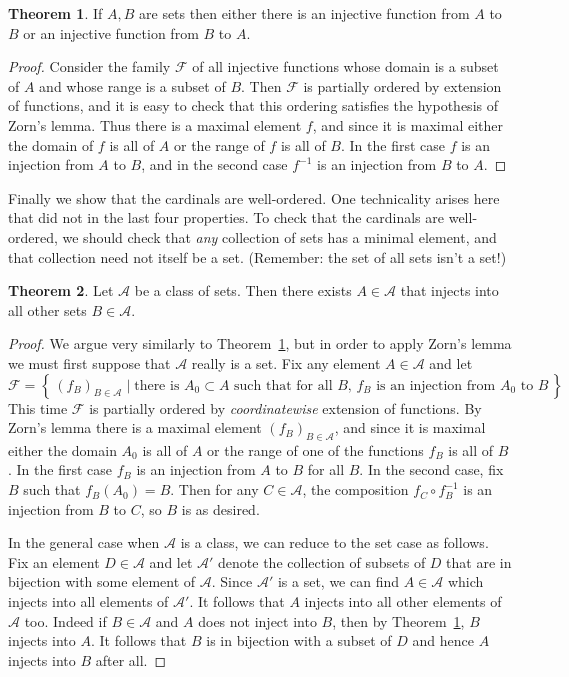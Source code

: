 \documentclass[11pt,oneside]{amsart}
\newcommand{\set}[1]{\left\{\,#1\,\right\}}
\theoremstyle{definition}
\newtheorem{thm}{Theorem}[section]
\theoremstyle{definition}
\theoremstyle{remark}
\begin{document}
\begin{thm}
  \label{thm:card-total}
  If $A,B$ are sets then either there is an injective function from $A$ to $B$ or an injective function from $B$ to $A$.
\end{thm}

\begin{proof}
  Consider the family $\mathcal F$ of all injective functions whose domain is a subset of $A$ and whose range is a subset of $B$. Then $\mathcal F$ is partially ordered by extension of functions, and it is easy to check that this ordering satisfies the hypothesis of Zorn's lemma. Thus there is a maximal element $f$, and since it is maximal either the domain of $f$ is all of $A$ or the range of $f$ is all of $B$. In the first case $f$ is an injection from $A$ to $B$, and in the second case $f^{-1}$ is an injection from $B$ to $A$.
\end{proof}

Finally we show that the cardinals are well-ordered. One technicality arises here that did not in the last four properties. To check that the cardinals are well-ordered, we should check that \emph{any} collection of sets has a minimal element, and that collection need not itself be a set. (Remember: the set of all sets isn't a set!)

\begin{thm}
  \label{thm:card-well}
  Let $\mathcal A$ be a class of sets. Then there exists $A\in\mathcal A$ that injects into all other sets $B\in\mathcal A$.
\end{thm}

\begin{proof}
  We argue very similarly to Theorem~\ref{thm:card-total}, but in order to apply Zorn's lemma we must first suppose that $\mathcal A$ really is a set. Fix any element $A\in\mathcal A$ and let
\[\mathcal F=\set{(f_B)_{B\in\mathcal A}\mid \text{there is $A_0\subset A$ such that for all $B$, $f_B$ is an injection from $A_0$ to $B$}}
\]
This time $\mathcal F$ is partially ordered by \emph{coordinatewise} extension of functions. By Zorn's lemma there is a maximal element $(f_B)_{B\in\mathcal A}$, and since it is maximal either the domain $A_0$ is all of $A$ or the range of one of the functions $f_B$ is all of $B$. In the first case $f_B$ is an injection from $A$ to $B$ for all $B$. In the second case, fix $B$ such that $f_B(A_0)=B$. Then for any $C\in\mathcal A$, the composition $f_C\circ f_B^{-1}$ is an injection from $B$ to $C$, so $B$ is as desired.

In the general case when $\mathcal A$ is a class, we can reduce to the set case as follows. Fix an element $D\in\mathcal A$ and let $\mathcal A'$ denote the collection of subsets of $D$ that are in bijection with some element of $\mathcal A$. Since $\mathcal A'$ is a set, we can find $A\in\mathcal A$ which injects into all elements of $\mathcal A'$. It follows that $A$ injects into all other elements of $\mathcal A$ too. Indeed if $B\in\mathcal A$ and $A$ does not inject into $B$, then by Theorem~\ref{thm:card-total}, $B$ injects into $A$. It follows that $B$ is in bijection with a subset of $D$ and hence $A$ injects into $B$ after all.
\end{proof}
\end{document}
